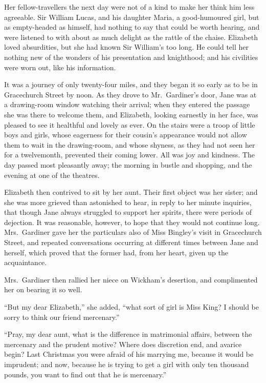 \documentclass[12pt,english]{book}
\begin{document}
Her fellow-travellers the next day were not of a kind to make her
think him less agreeable. Sir William Lucas, and his daughter Maria,
a good-humoured girl, but as empty-headed as himself, had nothing
to say that could be worth hearing, and were listened to with about
as much delight as the rattle of the chaise. Elizabeth loved absurdities,
but she had known Sir William's too long. He could tell her nothing
new of the wonders of his presentation and knighthood; and his civilities
were worn out, like his information.

It was a journey of only twenty-four miles, and they began it so early
as to be in Gracechurch Street by noon. As they drove to Mr.\ Gardiner's
door, Jane was at a drawing-room window watching their arrival; when
they entered the passage she was there to welcome them, and Elizabeth,
looking earnestly in her face, was pleased to see it healthful and
lovely as ever. On the stairs were a troop of little boys and girls,
whose eagerness for their cousin's appearance would not allow them
to wait in the drawing-room, and whose shyness, as they had not seen
her for a twelvemonth, prevented their coming lower. All was joy and
kindness. The day passed most pleasantly away; the morning in bustle
and shopping, and the evening at one of the theatres.

Elizabeth then contrived to sit by her aunt. Their first object was
her sister; and she was more grieved than astonished to hear, in reply
to her minute inquiries, that though Jane always struggled to support
her spirits, there were periods of dejection. It was reasonable, however,
to hope that they would not continue long. Mrs.\ Gardiner gave her
the particulars also of Miss Bingley's visit in Gracechurch Street,
and repeated conversations occurring at different times between Jane
and herself, which proved that the former had, from her heart, given
up the acquaintance.

Mrs.\ Gardiner then rallied her niece on Wickham's desertion, and
complimented her on bearing it so well.

{}``But my dear Elizabeth,'' she added, {}``what sort of girl is
Miss King? I should be sorry to think our friend mercenary.''

{}``Pray, my dear aunt, what is the difference in matrimonial affairs,
between the mercenary and the prudent motive? Where does discretion
end, and avarice begin? Last Christmas you were afraid of his marrying
me, because it would be imprudent; and now, because he is trying to
get a girl with only ten thousand pounds, you want to find out that
he is mercenary.''
\end{document}
